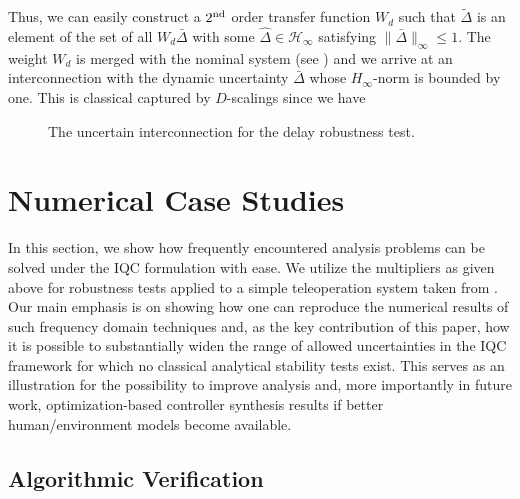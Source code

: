 Thus, we can easily construct a $2\textsuperscript{nd}$ order transfer function $W_d$ such that $\tilde{\Delta}$ is an element of the set of all $W_d\bar{\Delta}$ with some $\hat \Delta\in \mathcal{H}_\infty$ satisfying $\|\bar{\Delta}\|_\infty\leq 1$. The weight $W_d$ is merged with the nominal system (see ) and we arrive at an interconnection with the dynamic uncertainty $\bar{\Delta}$ whose $H_\infty$-norm is bounded by one. This is classical captured by $D$-scalings since we have



\begin{figure}
\begin{center}
	\caption{The uncertain interconnection for the delay robustness test.}
	\label{fig:uncicpasdelay}
\end{center}
\end{figure}

\section{Numerical Case Studies}\label{sec:num}
In this section, we show how frequently encountered analysis problems can be solved under the IQC formulation with ease.
We utilize the multipliers as given above for  robustness tests applied to a simple teleoperation system taken from \cite{willaert,willaertIJRR10}.
Our main emphasis is on showing how one can reproduce the numerical results of such frequency domain techniques and, as the key contribution of this paper, how it is possible to substantially widen the range of allowed uncertainties in the IQC framework for which no classical analytical stability tests exist. This serves as an illustration for the possibility to improve analysis and, more importantly in future work, optimization-based controller synthesis results if better human/environment models become available.

\subsection{Algorithmic Verification}\label{sec:algver}

